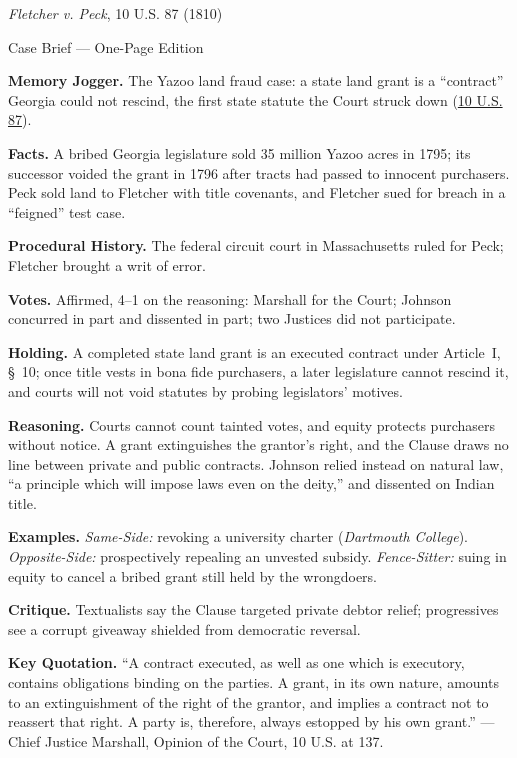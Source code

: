 \documentclass[12pt]{article}
\begin{document}
\begin{center}
{\Large \textit{Fletcher v. Peck}, 10 U.S. 87 (1810)\par}
\vspace{0.3em}
{\normalsize Case Brief --- One-Page Edition\par}
\end{center}

\textbf{Memory Jogger.} The Yazoo land fraud case: a state land grant is a ``contract'' Georgia could not rescind, the first state statute the Court struck down (\href{https://www.courtlistener.com/opinion/84935/fletcher-v-peck/}{10 U.S. 87}).

\textbf{Facts.} A bribed Georgia legislature sold 35 million Yazoo acres in 1795; its successor voided the grant in 1796 after tracts had passed to innocent purchasers. Peck sold land to Fletcher with title covenants, and Fletcher sued for breach in a ``feigned'' test case.

\textbf{Procedural History.} The federal circuit court in Massachusetts ruled for Peck; Fletcher brought a writ of error.

\textbf{Votes.} Affirmed, 4--1 on the reasoning: Marshall for the Court; Johnson concurred in part and dissented in part; two Justices did not participate.

\textbf{Holding.} A completed state land grant is an executed contract under Article~I, \S~10; once title vests in bona fide purchasers, a later legislature cannot rescind it, and courts will not void statutes by probing legislators' motives.

\textbf{Reasoning.} Courts cannot count tainted votes, and equity protects purchasers without notice. A grant extinguishes the grantor's right, and the Clause draws no line between private and public contracts. Johnson relied instead on natural law, ``a principle which will impose laws even on the deity,'' and dissented on Indian title.

\textbf{Examples.} \emph{Same-Side:} revoking a university charter (\textit{Dartmouth College}). \emph{Opposite-Side:} prospectively repealing an unvested subsidy. \emph{Fence-Sitter:} suing in equity to cancel a bribed grant still held by the wrongdoers.

\textbf{Critique.} Textualists say the Clause targeted private debtor relief; progressives see a corrupt giveaway shielded from democratic reversal.

\textbf{Key Quotation.} ``A contract executed, as well as one which is executory, contains obligations binding on the parties. A grant, in its own nature, amounts to an extinguishment of the right of the grantor, and implies a contract not to reassert that right. A party is, therefore, always estopped by his own grant.'' --- Chief Justice Marshall, Opinion of the Court, 10 U.S. at 137.
\end{document}
